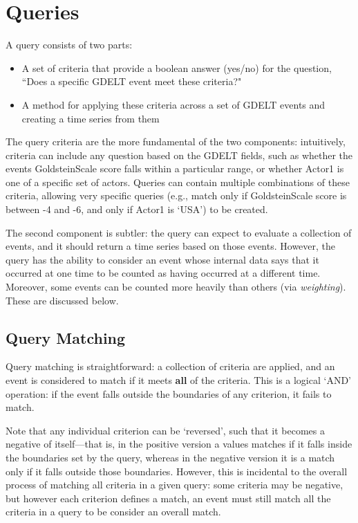 
\chapter{Queries} \label{chap:Queries}
\par A query consists of two parts:

\begin{itemize}
  \item A set of criteria that provide a boolean answer (yes/no) for the question, ``Does a specific GDELT event meet these criteria?"
  \item A method for applying these criteria across a set of GDELT events and creating a time series from them
\end{itemize}

\par The query criteria are the more fundamental of the two components: intuitively, criteria can include any question based on the GDELT fields, such as whether the events GoldsteinScale score falls within a particular range, or whether Actor1 is one of a specific set of actors. Queries can contain multiple combinations of these criteria, allowing very specific queries (e.g., match only if GoldsteinScale score is between -4 and -6, and only if Actor1 is `USA') to be created.

\par The second component is subtler: the query can expect to evaluate a collection of events, and it should return a time series based on those events. However, the query has the ability to consider an event whose internal data says that it occurred at one time to be counted as having occurred at a different time. Moreover, some events can be counted more heavily than others (via \textit{weighting}). These are discussed below.

\section{Query Matching}
\par Query matching is straightforward: a collection of criteria are applied, and an event is considered to match if it meets \textbf{all} of the criteria. This is a logical `AND' operation: if the event falls outside the boundaries of any criterion, it fails to match.

\par Note that any individual criterion can be `reversed', such that it becomes a negative of itself---that is, in the positive version a values matches if it falls inside the boundaries set by the query, whereas in the negative version it is a match only if it falls outside those boundaries. However, this is incidental to the overall process of matching all criteria in a given query: some criteria may be negative, but however each criterion defines a match, an event must still match all the criteria in a query to be consider an overall match.

